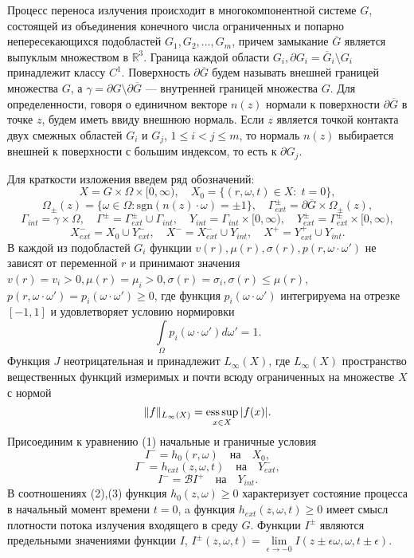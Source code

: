 \documentclass[12pt,reqno]{report}
\def\sgn{\mathrm{sgn}}
\begin{document}
Процесс переноса излучения происходит в
многокомпонентной системе $G$, состоящей из объединения конечного
числа ограниченных и попарно непересекающихся подобластей
$G_1,G_2,...,G_m$, причем замыкание $\overline{G}$ является
выпуклым множеством в $\mathbb{R}^3$. Граница каждой области
$G_i, \partial G_i=\overline{G}_i\setminus G_i$ принадлежит
классу $C^1$. Поверхность $\partial \overline {G}$ будем называть
внешней границей множества $G$, а $\gamma =\partial G \setminus
\partial \overline{G}$ --- внутренней границей множества $G$.
Для определенности, говоря о единичном векторе $n(z)$ нормали к
поверхности $\partial \overline{G}$ в точке $z$, будем иметь
ввиду внешнюю нормаль. Если $z$ является точкой контакта двух
смежных областей $G_i$ и $G_j$, $1 \leq i < j \leq m$, то нормаль
$n(z)$ выбирается внешней к поверхности с большим индексом, то
есть к $\partial{G_j}$.




Для краткости изложения введем ряд обозначений:
$$
X=G\times \Omega \times [0,\infty), \quad X_0=\{(r,\omega,t)\in
X:\; t=0 \}, 
$$
$$
\Omega_{\pm}(z)= \{ \omega \in \Omega : \sgn (n(z) \cdot
\omega)=\pm 1\}, \quad \Gamma^{\pm}_{ext} =
\partial \overline{G} \times \Omega_{\pm}(z), 
$$
$$
 \Gamma_{int}=\gamma \times \Omega, \quad
\Gamma^{\pm}=\Gamma^{\pm}_{ext}\cup \Gamma_{int},
\quad
Y_{int}=\Gamma_{int}\times[0,\infty), \quad
Y^{\pm}_{ext}=\Gamma^{\pm}_{ext}\times [0,\infty), 
$$
$$
X^{-}_{ext}=X_0 \cup Y^{-}_{ext}, \quad  X^{-}=X^{-}_{ext}\cup Y_{int},
\quad X^{+}=Y^{+}_{ext}\cup Y_{int}.
$$
В каждой из подобластей $G_i$ функции $v(r),\mu(r), \sigma(r),
p(r,\omega \cdot \omega')$ не зависят от переменной $r$ и
принимают значения $v(r)=v_i>0, \mu(r)=\mu_i > 0,
\sigma(r)=\sigma_i, \sigma(r) \leq \mu(r)$, $p(r,\omega \cdot
\omega')=p_i(\omega \cdot \omega') \geq 0$, где функция
$p_i(\omega \cdot \omega')$ интегрируема на отрезке $[-1,1]$ и
удовлетворяет условию нормировки
$$
\int \limits_{\Omega} p_i(\omega \cdot \omega') d\omega'=1.
$$
Функция $J$ неотрицательная и принадлежит $L_{\infty}(X)$, где
$L_{\infty}(X)$ пространство вещественных функций измеримых и
почти всюду ограниченных на множестве $X$ с нормой 
$$
\|f\|_{L_{\infty}(X)}=
\mathop{\fam0 ess\,sup} \limits_{x \in X} |f(x)|.
$$
Присоединим к уравнению (1) начальные и граничные условия
\begin{equation}
I^- =h_0(r,\omega) \quad \text{на} \quad X_0,
\end{equation}
\begin{equation}
I^-= h_{ext}(z,\omega,t) \quad \text{на} \quad Y^-_{ext},
\end{equation}
\begin{equation}
I^-=\mathcal BI^+ \quad \text{на}\quad Y_{int}.
\end{equation}
В соотношениях (2),(3) функция $h_0(z,\omega)\geq 0$
характеризует состояние процесса в начальный момент времени $t=0$,
a функция $h_{ext}(z,\omega,t) \geq 0$ имеет смысл плотности
потока излучения входящего в среду $G$. Функции $I^{\pm}$ являются
предельными значениями функции $I$, $I^{\pm}(z,\omega,t)= \lim
\limits_{\epsilon \to -0} I(z \pm \epsilon \omega, \omega,t \pm
\epsilon)$. 
\end{document}
